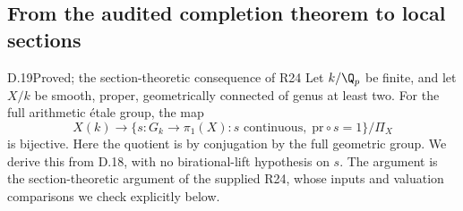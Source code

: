 \subsection{From the audited completion theorem to local sections}

\begin{claim}{D.19}{Proved; the section-theoretic consequence of R24}
Let $k/\Q_p$ be finite, and let $X/k$ be smooth, proper,
geometrically connected of genus at least two. For the full arithmetic
\'{e}tale group, the map
\[
 X(k)\longrightarrow
 \{s:G_k\longrightarrow\pi_1(X):s\text{ continuous},\;
                         \mathrm{pr}\circ s=1\}/\Pi_X
\]
is bijective. Here the quotient is by conjugation by the full geometric
group. We derive this from D.18, with no birational-lift hypothesis on $s$.
The argument is the section-theoretic argument of the supplied R24,
whose inputs and valuation comparisons we check explicitly below.
\end{claim}
